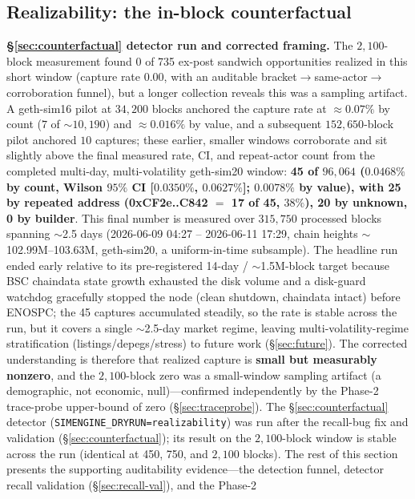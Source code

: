 \documentclass[11pt]{article}
\newcommand{\code}[1]{\texttt{#1}}
\begin{document}
\subsection{Realizability: the in-block counterfactual}
\label{sec:realizability}
\textbf{\S\ref{sec:counterfactual} detector run and corrected framing.} The
$2{,}100$-block measurement found 0 of 735 ex-post sandwich opportunities realized in
this short window (capture rate $0.00$, with an auditable
bracket$\to$same-actor$\to$corroboration funnel), but a longer collection reveals this
was a sampling artifact. A geth-sim16 pilot at $34{,}200$ blocks anchored the capture
rate at $\approx$$0.07\%$ by count ($7$ of $\sim$$10{,}190$) and $\approx$$0.016\%$ by
value, and a subsequent $152{,}650$-block pilot anchored $10$ captures; these earlier, smaller windows corroborate and sit slightly above the final measured rate, CI, and repeat-actor count
from the completed multi-day, multi-volatility geth-sim20 window:
\textbf{45 of $96{,}064$ ($0.0468\%$ by count, Wilson $95\%$ CI [$0.0350\%$,
$0.0627\%$]; $0.0078\%$ by value), with 25 by repeated address (0xCF2e..C842 $=$ 17 of
45, $38\%$), 20 by unknown, 0 by builder}. This final number is measured over
$315{,}750$ processed blocks spanning $\sim$2.5 days (2026-06-09 04:27 -- 2026-06-11
17:29, chain heights $\sim$102.99M--103.63M, geth-sim20, a uniform-in-time subsample).
The headline run ended early relative to its pre-registered 14-day / $\sim$1.5M-block
target because BSC chaindata state growth exhausted the disk volume and a disk-guard
watchdog gracefully stopped the node (clean shutdown, chaindata intact) before ENOSPC;
the 45 captures accumulated steadily, so the rate is stable across the run, but it
covers a single $\sim$2.5-day market regime, leaving multi-volatility-regime
stratification (listings/depegs/stress) to future work (\S\ref{sec:future}). The
corrected understanding is therefore that realized capture
is \textbf{small but measurably nonzero}, and the $2{,}100$-block zero was a small-window
sampling artifact (a demographic, not economic, null)---confirmed independently by the
Phase-2 trace-probe upper-bound of zero (\S\ref{sec:traceprobe}). The
\S\ref{sec:counterfactual} detector (\code{SIMENGINE\_DRYRUN=realizability}) was run
after the recall-bug fix and validation (\S\ref{sec:counterfactual}); its result on the
$2{,}100$-block window is stable across the run (identical at 450, 750, and $2{,}100$
blocks). The rest of this section presents the supporting auditability evidence---the
detection funnel, detector recall validation (\S\ref{sec:recall-val}), and the Phase-2
$$
\end{document}
